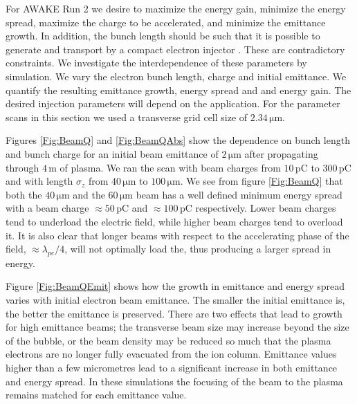 \documentclass[aps,prstab,reprint,amsmath,amssymb,groupedaddress]{revtex4-1}
\newcommand{\unit}[1]{\,\mathrm{#1}}
\begin{document}
For AWAKE Run 2 we desire to maximize the energy gain, minimize the energy spread, maximize the charge to be
accelerated, and minimize the emittance growth. In addition, the bunch length should be such that it is possible to
generate and transport by a compact electron injector \cite{adli:2016}. These are contradictory constraints. We
investigate the interdependence of these parameters by simulation. We vary the electron bunch length, charge and initial
emittance. We quantify the resulting emittance growth, energy spread and and energy gain. The desired injection
parameters will depend on the application. For the parameter scans in this section we used a transverse grid cell size
of $2.34\unit{\mu m}$.

Figures \ref{Fig:BeamQ} and \ref{Fig:BeamQAbs} show the dependence on bunch length and bunch charge for an initial beam
emittance of $2\unit{\mu m}$ after propagating through $4\unit{m}$ of plasma. We ran the scan with beam charges from
$10\unit{pC}$ to $300\unit{pC}$ and with length $\sigma_{z}$ from $40\unit{\mu m}$ to $100\unit{\mu m}$. We see from
figure \ref{Fig:BeamQ} that both the $40\unit{\mu m}$ and the $60\unit{\mu m}$ beam has a well defined minimum energy
spread with a beam charge $\approx 50\unit{pC}$ and $\approx 100\unit{pC}$ respectively. Lower beam charges tend to
underload the electric field, while higher beam charges tend to overload it. It is also clear that longer beams with
respect to the accelerating phase of the field, $\approx\lambda_{pe}/4$, will not optimally load the,
thus producing a larger spread in energy.

Figure \ref{Fig:BeamQEmit} shows how the growth in emittance and energy spread varies with initial electron beam
emittance. The smaller the initial emittance is, the better the emittance is preserved. There are two effects that lead
to growth for high emittance beams; the transverse beam size may increase beyond the size of the bubble, or the beam
density may be reduced so much that the plasma electrons are no longer fully evacuated from the ion column. Emittance
values higher than a few micrometres lead to a significant increase in both emittance and energy spread. In these
simulations the focusing of the beam to the plasma remains matched for each emittance value.

\end{document}
